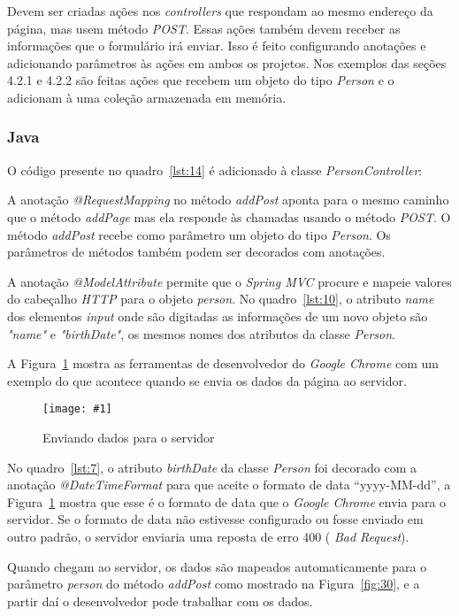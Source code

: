 \documentclass[a4paper,12pt]{article}
\newcommand{\figura}[3] {
	\begin{figure}[ht]
		\centering
		\texttt{[image: \#1]}
		\caption{#2}
		\label{#3}
	\end{figure}
	\FloatBarrier
}
\newcommand{\est}[1] {
\textit{#1}}
\newcommand{\classe}[1] {
\textit{#1}}
\newcommand{\annotation}[1] {
\textit{#1}}
\newcommand{\metodo}[1] {
\textit{#1}}
\newcommand{\javacode}[3] {
	
}
\begin{document}
Devem ser criadas ações nos \est{controllers} que respondam ao mesmo endereço da página, mas usem método \est{POST}. Essas ações também devem receber as informações que o formulário irá enviar. Isso é feito configurando anotações e adicionando parâmetros às ações em ambos os projetos. Nos exemplos das seções 4.2.1 e 4.2.2 são feitas ações que recebem um objeto do tipo \classe{Person} e o adicionam à uma coleção armazenada em memória.

\subsubsection{Java}

O código presente no quadro~\ref{lst:14} é adicionado à classe \classe{PersonController}:

\javacode{code/14.txt}{Ação de \classe{PersonController} no projeto Java que responde ao método \est{POST}}{lst:14}

A anotação \annotation{@RequestMapping} no método \metodo{addPost} aponta para o mesmo caminho que o método \metodo{addPage} mas ela responde às chamadas usando o método \est{POST}. O método \metodo{addPost} recebe como parâmetro um objeto do tipo \classe{Person}. Os parâmetros de métodos também podem ser decorados com anotações.

A anotação \annotation{@ModelAttribute} permite que o \est{Spring MVC} procure e mapeie valores do cabeçalho \est{HTTP} para o objeto \est{person}. No quadro~\ref{lst:10}, o atributo \est{name} dos elementos \est{input} onde são digitadas as informações de um novo objeto são \est{"name"} e \est{"birthDate"}, os mesmos nomes dos atributos da classe \classe{Person}.

A Figura~\ref{fig:29} mostra as ferramentas de desenvolvedor do \est{Google Chrome} com um exemplo do que acontece quando se envia os dados da página ao servidor.

\figura{29.png}{Enviando dados para o servidor}{fig:29}

No quadro~\ref{lst:7}, o atributo \est{birthDate} da classe \classe{Person} foi decorado com a anotação \annotation{@DateTimeFormat} para que aceite o formato de data “yyyy-MM-dd”, a Figura~\ref{fig:29} mostra que esse é o formato de data que o \est{Google Chrome} envia para o servidor. Se o formato de data não estivesse configurado ou fosse enviado em outro padrão, o servidor enviaria uma reposta de erro 400 (\est{Bad Request}).

Quando chegam ao servidor, os dados são mapeados automaticamente para o parâmetro \est{person} do método \metodo{addPost} como mostrado na Figura~\ref{fig:30}, e a partir daí o desenvolvedor pode trabalhar com os dados.
\end{document}
